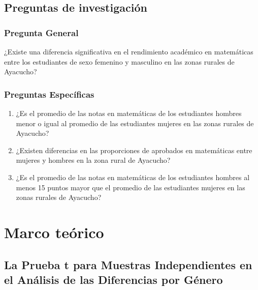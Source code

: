 \documentclass[
]{article}
\begin{document}
\subsection*{Preguntas de
investigación}\label{preguntas-de-investigaciuxf3n}

\subsubsection*{Pregunta General}\label{pregunta-general}

¿Existe una diferencia significativa en el rendimiento académico en
matemáticas entre los estudiantes de sexo femenino y masculino en las
zonas rurales de Ayacucho?

\subsubsection*{Preguntas Específicas}\label{preguntas-especuxedficas}

\begin{center}

\justify
\begin{enumerate}
    \item ¿Es el promedio de las notas en matemáticas de los estudiantes hombres menor o igual al promedio de las estudiantes mujeres en las zonas rurales de Ayacucho?
    \item ¿Existen diferencias en las proporciones de aprobados en matemáticas entre mujeres y hombres en la zona rural de Ayacucho?
    \item ¿Es el promedio de las notas en matemáticas de los estudiantes hombres al menos 15 puntos mayor que el promedio de las estudiantes mujeres en las zonas rurales de Ayacucho?  
    
\end{enumerate}

\end{center}

\section*{Marco teórico}\label{marco-teuxf3rico}

\subsection*{La Prueba t para Muestras Independientes en el Análisis de
las Diferencias por
Género}\label{la-prueba-t-para-muestras-independientes-en-el-anuxe1lisis-de-las-diferencias-por-guxe9nero}
\end{document}
